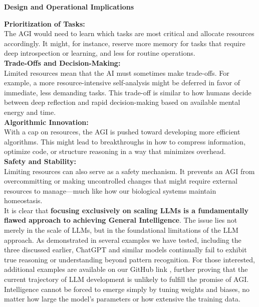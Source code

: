 \documentclass[11pt]{scrartcl}
\begin{document}
\begin{huge}
\textbf{Design and Operational Implications} \\
\end{huge}
\textbf{Prioritization of Tasks:} \\
The AGI would need to learn which tasks are most critical and allocate resources accordingly. It might, for instance, reserve more memory for tasks that require deep introspection or learning, and less for routine operations. \\
\textbf{Trade-Offs and Decision-Making:} \\
Limited resources mean that the AI must sometimes make trade-offs. For example, a more resource-intensive self-analysis might be deferred in favor of immediate, less demanding tasks. This trade-off is similar to how humans decide between deep reflection and rapid decision-making based on available mental energy and time. \\
\textbf{Algorithmic Innovation:} \\
With a cap on resources, the AGI is pushed toward developing more efficient algorithms. This might lead to breakthroughs in how to compress information, optimize code, or structure reasoning in a way that minimizes overhead. \\
\textbf{Safety and Stability:} \\
Limiting resources can also serve as a safety mechanism. It prevents an AGI from overcommitting or making uncontrolled changes that might require external resources to manage—much like how our biological systems maintain homeostasis. \\

It is clear that \textbf{focusing exclusively on scaling LLMs is a fundamentally flawed approach to achieving General Intelligence}. The issue lies not merely in the scale of LLMs, but in the foundational limitations of the LLM approach. As demonstrated in several examples we have tested, including the three discussed earlier, ChatGPT and similar models continually fail to exhibit true reasoning or understanding beyond pattern recognition. For those interested, additional examples are available on our GitHub link \cite{ref8}, further proving that the current trajectory of LLM development is unlikely to fulfill the promise of AGI. Intelligence cannot be forced to emerge simply by tuning weights and biases, no matter how large the model's parameters or how extensive the training data. \\
\end{document}

